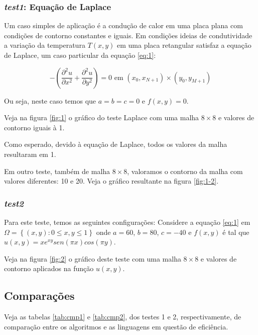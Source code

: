 \documentclass[
	11pt,				%
	oneside,			%
	a4paper,			%
	english,			%
	brazil,				%
	]{article}
\begin{document}
\subsubsection{\textit{test1}: Equação de Laplace}
Um caso simples de aplicação é a condução de calor em uma placa plana com condições de contorno constantes e iguais. Em condições ideias de condutividade a variação da temperatura $T(x,y)$ em uma placa retangular satisfaz a equação de Laplace, um caso particular da equação \eqref{eq:1}:

\begin{equation} \label{eq:2}
- \left(\frac{\partial^2 u}{\partial x^2} + \frac{\partial^2 u}{\partial y^2}\right) = 0
\text{ em } (x_0,x_{N+1}) \times (y_0,y_{M+1})
\end{equation}

Ou seja, neste caso temos que $ a = b = c = 0 $ e $ f(x,y) = 0 $.

Veja na figura \ref{fig:1} o gráfico do teste Laplace com uma malha $8\times8$ e valores de contorno iguais à 1.

Como esperado, devido à equação de Laplace, todos os valores da malha resultaram em 1.

Em outro teste, também de malha $8\times8$, valoramos o contorno da malha com valores diferentes: 10 e 20. Veja o gráfico resultante na figura \ref{fig:1-2}.

\subsubsection{\textit{test2}}
Para este teste, temos as seguintes configurações: Considere a equação \eqref{eq:1} em $ \Omega = \left\{(x,y) : 0 \le x,y \le 1\right\} $ onde $a = 60$, $b = 80$, $c = -40$ e $f(x,y)$ é tal que $u(x,y) = xe^{xy}sen(\pi x)cos(\pi y)$.

Veja na figura \ref{fig:2} o gráfico deste teste com uma malha $8\times8$ e valores de contorno aplicados na função $u(x,y)$.


\subsection{Comparações}
Veja as tabelas \ref{tab:cmp1} e \ref{tab:cmp2}, dos testes 1 e 2, respectivamente, de comparação entre os algoritmos e as linguagens em questão de eficiência.
\end{document}
